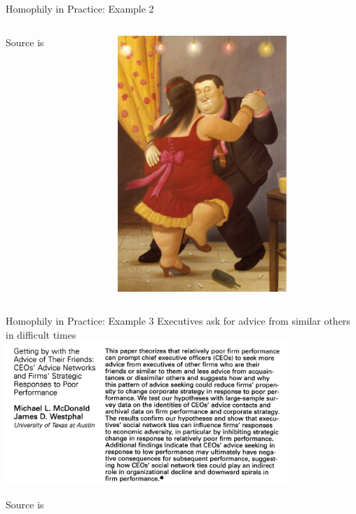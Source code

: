 \documentclass[notes, aspectratio=1610]{beamer}
\begin{document}
\begin{frame}{Homophily in Practice: Example 2}
\begin{columns}[t]
\begin{column}{0.5\textwidth}
			\footnotesize
			Source is \cite{mcfarland2013}
		\end{column}
		\begin{column}{0.5\textwidth}
			\centering
			\includegraphics[width=0.7\textwidth]{images/romantic_relation.jpg}
		\end{column}
	\end{columns}
\end{frame}

\begin{frame}{Homophily in Practice: Example 3}
	{Executives ask for advice from similar others in difficult times}
	\centering
	\includegraphics[width=0.8\textwidth]{images/mcdonald_westphal.png}

	\footnotesize
	Source is \cite{mcdonald2003}
\end{frame}
\end{document}

